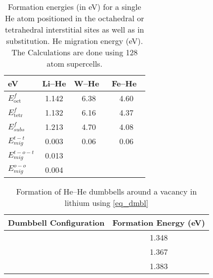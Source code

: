\documentclass[aps,prl,amsmath,amssymb,reprint]{revtex4-1}
\begin{document}
\begin{table}
\caption[]{Formation energies (in eV) for a single He atom positioned in the octahedral or tetrahedral interstitial sites as well as in substitution. He migration energy (eV). The Calculations are done using 128 atom supercells.}
\label{table:he_li} 
\centering
\begin{tabular}{l|c|c|c} \hline \hline
eV                & Li--He  &  W--He~\cite{becquart2007ab}   &  Fe--He~\cite{seletskaia2005magnetic} \\ \hline
    $E^{f}_{\text{oct}}$  & 1.142   &  6.38    & 4.60   \\ \hline
    $E^{f}_{\text{tetr}}$ & 1.132   &  6.16    & 4.37   \\ \hline
    $E^f_{subs}$          & 1.213   &  4.70    & 4.08   \\ \hline
    $E^{t-t}_{mig}$       & 0.003   &  0.06    & 0.06    \\ \hline 
	$E^{t-o-t}_{mig}$     & 0.013   &		   &		\\ \hline
	$E^{o-o}_{mig}$		  & 0.004   &			&		\\ \hline
\end{tabular}
\end{table}

\begin{table}
\caption[]{Formation of  He--He dumbbells around a vacancy in lithium using \eqref{eq_dmbl}}
\label{table:dumbel}
\centering
\begin{tabular}{c|c} \hline \hline
Dumbbell Configuration & Formation Energy (eV) \\ \hline
{}   & 1.348 \\ \hline
{}   & 1.367  \\ \hline
{}   & 1.383 \\ \hline
\end{tabular}
\end{table}



\begin{acknowledgments}

\end{acknowledgments}



\end{document}
